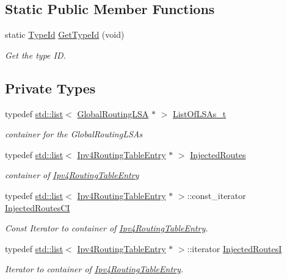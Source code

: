 \subsection*{Static Public Member Functions}
\begin{DoxyCompactItemize}
\item 
static \hyperlink{classns3_1_1TypeId}{Type\+Id} \hyperlink{classns3_1_1GlobalRouter_a0154feb219f179c98f57ce14e966fc28}{Get\+Type\+Id} (void)
\begin{DoxyCompactList}\small\item\em Get the type ID. \end{DoxyCompactList}\end{DoxyCompactItemize}
\subsection*{Private Types}
\begin{DoxyCompactItemize}
\item 
typedef \hyperlink{openflow-interface_8h_afd9bcfa176617760671b67580f536fa7}{std\+::list}$<$ \hyperlink{classns3_1_1GlobalRoutingLSA}{Global\+Routing\+L\+SA} $\ast$ $>$ \hyperlink{classns3_1_1GlobalRouter_a01ba626a41e2ac7d2f53bd9adab92556}{List\+Of\+L\+S\+As\+\_\+t}
\begin{DoxyCompactList}\small\item\em container for the Global\+Routing\+L\+S\+As \end{DoxyCompactList}\item 
typedef \hyperlink{openflow-interface_8h_afd9bcfa176617760671b67580f536fa7}{std\+::list}$<$ \hyperlink{classns3_1_1Ipv4RoutingTableEntry}{Ipv4\+Routing\+Table\+Entry} $\ast$ $>$ \hyperlink{classns3_1_1GlobalRouter_a26119d19a18a0c540baffdc16f0a731f}{Injected\+Routes}
\begin{DoxyCompactList}\small\item\em container of \hyperlink{classns3_1_1Ipv4RoutingTableEntry}{Ipv4\+Routing\+Table\+Entry} \end{DoxyCompactList}\item 
typedef \hyperlink{openflow-interface_8h_afd9bcfa176617760671b67580f536fa7}{std\+::list}$<$ \hyperlink{classns3_1_1Ipv4RoutingTableEntry}{Ipv4\+Routing\+Table\+Entry} $\ast$ $>$\+::const\+\_\+iterator \hyperlink{classns3_1_1GlobalRouter_aea87fa6405b7c0e2bd56adfcf37823a8}{Injected\+Routes\+CI}
\begin{DoxyCompactList}\small\item\em Const Iterator to container of \hyperlink{classns3_1_1Ipv4RoutingTableEntry}{Ipv4\+Routing\+Table\+Entry}. \end{DoxyCompactList}\item 
typedef \hyperlink{openflow-interface_8h_afd9bcfa176617760671b67580f536fa7}{std\+::list}$<$ \hyperlink{classns3_1_1Ipv4RoutingTableEntry}{Ipv4\+Routing\+Table\+Entry} $\ast$ $>$\+::iterator \hyperlink{classns3_1_1GlobalRouter_ac4ed7a61065c866b6f52abcdb2f29711}{Injected\+RoutesI}
\begin{DoxyCompactList}\small\item\em Iterator to container of \hyperlink{classns3_1_1Ipv4RoutingTableEntry}{Ipv4\+Routing\+Table\+Entry}. \end{DoxyCompactList}\end{DoxyCompactItemize}
